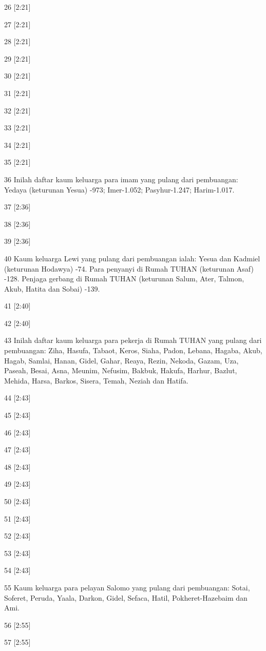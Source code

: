 \par 26 [2:21]
\par 27 [2:21]
\par 28 [2:21]
\par 29 [2:21]
\par 30 [2:21]
\par 31 [2:21]
\par 32 [2:21]
\par 33 [2:21]
\par 34 [2:21]
\par 35 [2:21]
\par 36 Inilah daftar kaum keluarga para imam yang pulang dari pembuangan: Yedaya (keturunan Yesua) -973; Imer-1.052; Pasyhur-1.247; Harim-1.017.
\par 37 [2:36]
\par 38 [2:36]
\par 39 [2:36]
\par 40 Kaum keluarga Lewi yang pulang dari pembuangan ialah: Yesua dan Kadmiel (keturunan Hodawya) -74. Para penyanyi di Rumah TUHAN (keturunan Asaf) -128. Penjaga gerbang di Rumah TUHAN (keturunan Salum, Ater, Talmon, Akub, Hatita dan Sobai) -139.
\par 41 [2:40]
\par 42 [2:40]
\par 43 Inilah daftar kaum keluarga para pekerja di Rumah TUHAN yang pulang dari pembuangan: Ziha, Hasufa, Tabaot, Keros, Siaha, Padon, Lebana, Hagaba, Akub, Hagab, Samlai, Hanan, Gidel, Gahar, Reaya, Rezin, Nekoda, Gazam, Uza, Paseah, Besai, Asna, Meunim, Nefusim, Bakbuk, Hakufa, Harhur, Bazlut, Mehida, Harsa, Barkos, Sisera, Temah, Neziah dan Hatifa.
\par 44 [2:43]
\par 45 [2:43]
\par 46 [2:43]
\par 47 [2:43]
\par 48 [2:43]
\par 49 [2:43]
\par 50 [2:43]
\par 51 [2:43]
\par 52 [2:43]
\par 53 [2:43]
\par 54 [2:43]
\par 55 Kaum keluarga para pelayan Salomo yang pulang dari pembuangan: Sotai, Soferet, Peruda, Yaala, Darkon, Gidel, Sefaca, Hatil, Pokheret-Hazebaim dan Ami.
\par 56 [2:55]
\par 57 [2:55]
